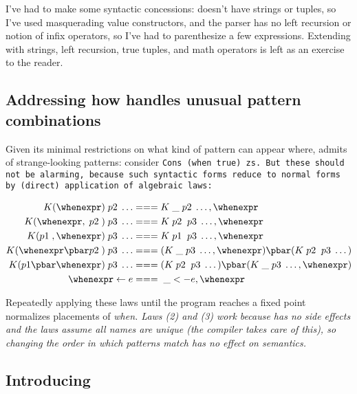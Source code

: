 \documentclass[manuscript,screen,review, 12pt, nonacm]{acmart}
\begin{document}
    I've had to make some syntactic concessions: \PPlus doesn't have strings or
    tuples, so I've used masquerading value constructors, and the parser has no
    left recursion or notion of infix operators, so I've had to parenthesize a
    few expressions. Extending \PPlus with strings, left recursion, true
    tuples, and math operators is left as an exercise to the reader. 
    
\subsection{Addressing how \PPlus handles unusual pattern combinations}
\label{ppweird}
    Given its minimal restrictions on what kind of pattern can appear where,
    \PPlus admits of strange-looking patterns: consider \tt{Cons (when true)
    zs}. But these should not be alarming, because such syntactic forms reduce
    to normal forms by (direct) application of algebraic laws: 

    \begin{align}
      K (\whenexpr) \;p2\; \dots &=== K \;\_ \;p2\; \dots, \whenexpr \\
      K (\whenexpr, \;p2\;) \;p3\; \dots  &=== K \;p2\; \;p3\; \dots, \whenexpr \\
      K (p1\;, \whenexpr) \;p3\; \dots  &=== K \;p1\; \;p3\; \dots, \whenexpr \\
      K (\whenexpr \pbar p2\;) \;p3\; \dots &=== (K \;\_ \;p3\; \dots, \whenexpr) \pbar (K \;p2\; \;p3\; \dots) \\
      K (p1 \pbar \whenexpr) \;p3\; \dots &=== (K \;p2\; \;p3\; \dots) \pbar (K \;\_ \;p3\; \dots, \whenexpr)  \\
      \whenexpr \leftarrow e &=== \;\_ <- e, \whenexpr
    \end{align}
    
    
    Repeatedly applying these laws until the program reaches a fixed point
    normalizes placements of \it{when}. Laws (2) and (3) work because \PPlus
    has no side effects and the laws assume all names are unique (the compiler
    takes care of this), so changing the order in which patterns match has no
    effect on semantics.         


\subsection{Introducing \VMinus }
\label{vminus}
\end{document}
